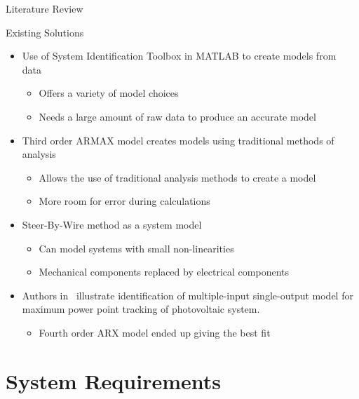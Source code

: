 \documentclass{beamer}
\begin{document}
\begin{frame}{Literature Review}
  \begin{block}{Existing Solutions}
 \begin{itemize}
        \item Use of System Identification Toolbox in MATLAB to create models from data~\cite{Adnan2010}
	 \begin{itemize}
		    \tiny
		    		\item Offers a variety of model choices
				\item Needs a large amount of raw data to produce an accurate model
	\end{itemize}
	\item Third order ARMAX model creates models using traditional methods of analysis~\cite{Li1999}
	 \begin{itemize}
		    \tiny
		    		\item Allows the use of traditional analysis methods to create a model 
				\item More room for error during calculations
	\end{itemize}
	\item Steer-By-Wire method as a system model~\cite{Saruchi2015}
	 \begin{itemize}
		    \tiny
		    		\item Can model systems with small non-linearities 
				\item Mechanical components replaced by electrical components 
	\end{itemize}
	\item Authors in~\cite{Hussain2011} illustrate identification of multiple-input single-output model for maximum power point tracking of photovoltaic system.  
	\begin{itemize}
	\tiny
		\item Fourth order ARX model ended up giving the best fit
	\end{itemize}
\end{itemize}
  \end{block}
\end{frame}



\section{System Requirements}
\end{document}
